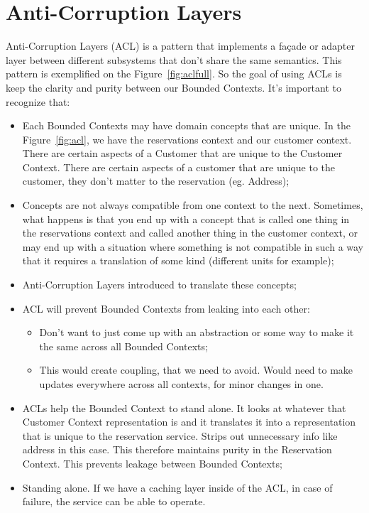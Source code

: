 \section{Anti-Corruption Layers}
Anti-Corruption Layers (ACL) is a pattern that implements a fa\c cade or adapter layer between different subsystems that don't share the same semantics. 
This pattern is exemplified on the Figure~\ref{fig:aclfull}. So the goal of using ACLs is keep the clarity and purity between our Bounded Contexts. It's important to recognize that:
\begin{itemize}
    \item Each Bounded Contexts may have domain concepts that are unique. In the Figure~\ref{fig:acl}, we have the reservations context and our customer context. There are certain aspects of a Customer that are unique to the Customer Context. There are certain aspects of a customer that are unique to the customer, they don't matter to the reservation (eg. Address);
    \item Concepts are not always compatible from one context to the next. Sometimes, what happens is that you end up with a concept that is called one thing in the reservations context and called another thing in the customer context, or may end up with a situation where something is not compatible in such a way that it requires a translation of some kind (different units for example);
    \item Anti-Corruption Layers introduced to translate these concepts;
    \item ACL will prevent Bounded Contexts from leaking into each other: 
    \begin{itemize}
        \item Don't want to just come up with an abstraction or some way to make it the same across all Bounded Contexts;
        \item This would create coupling, that we need to avoid. Would need to make updates everywhere across all contexts, for minor changes in one.
    \end{itemize}
    \item ACLs help the Bounded Context to stand alone. It looks at whatever that Customer Context representation is and it translates it into a representation that is unique to the reservation service. Strips out unnecessary info like address in this case. This therefore maintains purity in the Reservation Context. This prevents leakage between Bounded Contexts;
    \item Standing alone. If we have a caching layer inside of the ACL, in case of failure, the service can be able to operate.
\end{itemize}

